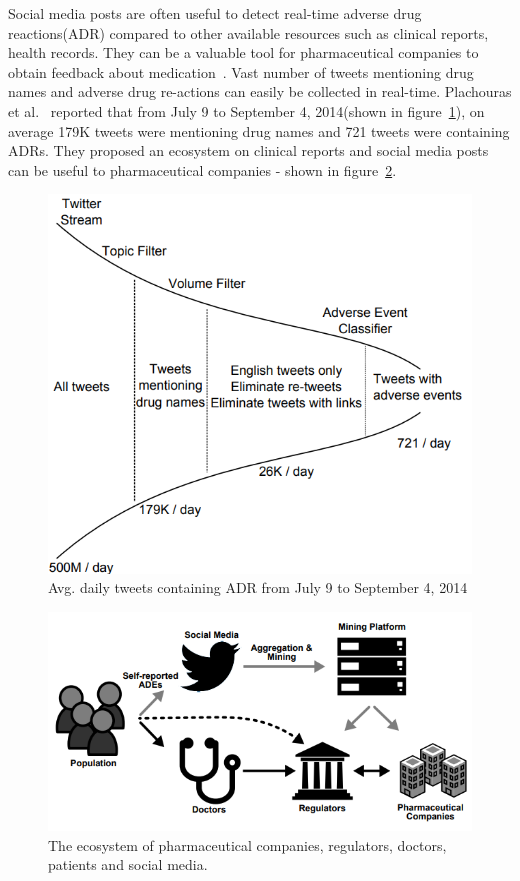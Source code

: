 Social media posts are often useful to detect real-time adverse drug reactions(ADR) compared to other available resources such as clinical reports, health records. They can be a valuable tool for pharmaceutical companies to obtain feedback about medication~\cite{plachouras2016quantifying, huynh2016adverse}. Vast number of tweets mentioning drug names and adverse drug re-actions can easily be collected in real-time. Plachouras et al.~\cite{plachouras2016quantifying} reported that from July 9 to September 4, 2014(shown in figure~\ref{fig:daily-tweets-adr}), on average 179K tweets were mentioning drug names and 721 tweets were containing ADRs. They proposed an ecosystem on clinical reports and social media posts can be useful to pharmaceutical companies - shown in figure~\ref{fig:ecosystem-pharmaceutical}.

\begin{figure}[h]
	\centering
	\includegraphics[width=0.99\linewidth]{Figures/g.png}
	\caption{Avg. daily tweets containing ADR from July 9 to September 4, 2014}
	\label{fig:daily-tweets-adr}
\end{figure}

\begin{figure}[h]
	\centering
	\includegraphics[width=0.99\linewidth]{Figures/j.png}
	\caption{The ecosystem of pharmaceutical companies, regulators, doctors, patients and social media.}
	\label{fig:ecosystem-pharmaceutical}
\end{figure}

